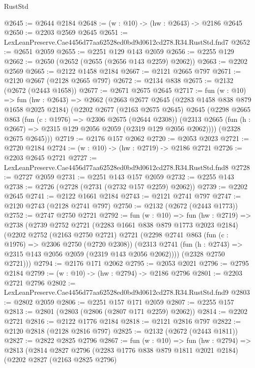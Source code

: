 \begin{lexlean}{RustStd}
\begin{coremodule}
@2645 := @2644 @2184
@2648 := (w : @10) -> (hw : @2643) -> @2186 @2645
@2650 := @2203 @2569 @2645
@2651 := LexLeanPreserve.Cae4456d77aa62528ed0bd9d0612cd278.R34.RustStd.fnd7
@2652 := @2651 @2059
@2655 := @2251 @129 @143 @2059
@2656 := @2255 @129
@2662 := @2650 (@2652 (@2655 (@2656 @143 @2259) @2062))
@2663 := @2202 @2569
@2665 := @2122 @1458 @2184
@2667 := @2121 @2665 @797
@2671 := @2120 @2667 (@2128 @2665 @797)
@2672 := @2134 @838
@2675 := @2132 (@2672 (@2443 @1658))
@2677 := @2671 @2675 @2645
@2717 := fun (w : @10) =>
  fun (hw : @2643) =>
  @2662
    (@2663
      @2677
      @2645
      (@2283 @1458 @838 @879 @1658 @2025 @2184)
      (@2202
        @2677
        (@2163 @2675 @2645)
        @2645
        (@2298
          @2665
          @863
          (fun (c : @1976) => @2306 @2675 (@2644 @2308))
          (@2313 @2665 (fun (h : @2667) => @2315 @129 @2056 @2059 (@2319 @129 @2056 @2062))))
        (@2328 @2675 @2645)))
@2719 := @2176 @157 @2062
@2720 := @2053 @2023
@2721 := @2720 @2184
@2724 := (w : @10) -> (hw : @2719) -> @2186 @2721
@2726 := @2203 @2645 @2721
@2727 := LexLeanPreserve.Cae4456d77aa62528ed0bd9d0612cd278.R34.RustStd.fnd8
@2728 := @2727 @2059
@2731 := @2251 @143 @157 @2059
@2732 := @2255 @143
@2738 := @2726 (@2728 (@2731 (@2732 @157 @2259) @2062))
@2739 := @2202 @2645
@2741 := @2122 @1661 @2184
@2743 := @2121 @2741 @797
@2747 := @2120 @2743 (@2128 @2741 @797)
@2750 := @2132 (@2672 (@2443 @1773))
@2752 := @2747 @2750 @2721
@2792 := fun (w : @10) =>
  fun (hw : @2719) =>
  @2738
    (@2739
      @2752
      @2721
      (@2283 @1661 @838 @879 @1773 @2023 @2184)
      (@2202
        @2752
        (@2163 @2750 @2721)
        @2721
        (@2298
          @2741
          @863
          (fun (c : @1976) => @2306 @2750 (@2720 @2308))
          (@2313 @2741 (fun (h : @2743) => @2315 @143 @2056 @2059 (@2319 @143 @2056 @2062))))
        (@2328 @2750 @2721)))
@2794 := @2176 @171 @2062
@2795 := @2053 @2021
@2796 := @2795 @2184
@2799 := (w : @10) -> (hw : @2794) -> @2186 @2796
@2801 := @2203 @2721 @2796
@2802 := LexLeanPreserve.Cae4456d77aa62528ed0bd9d0612cd278.R34.RustStd.fnd9
@2803 := @2802 @2059
@2806 := @2251 @157 @171 @2059
@2807 := @2255 @157
@2813 := @2801 (@2803 (@2806 (@2807 @171 @2259) @2062))
@2814 := @2202 @2721
@2816 := @2122 @1776 @2184
@2818 := @2121 @2816 @797
@2822 := @2120 @2818 (@2128 @2816 @797)
@2825 := @2132 (@2672 (@2443 @1811))
@2827 := @2822 @2825 @2796
@2867 := fun (w : @10) =>
  fun (hw : @2794) =>
  @2813
    (@2814
      @2827
      @2796
      (@2283 @1776 @838 @879 @1811 @2021 @2184)
      (@2202
        @2827
        (@2163 @2825 @2796)

\end{coremodule}
\end{lexlean}
